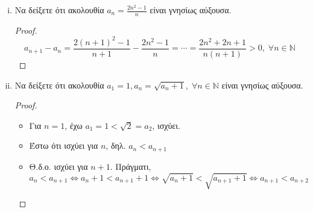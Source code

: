 \begin{enumerate}
\begin{enumerate}[i)]
            \item Να δείξετε ότι ακολουθία $ a_{n} = \frac{2n^{2}-1}{n} $ είναι γνησίως 
                αύξουσα.

                \begin{proof}
                    \[
                        a_{n+1}- a_{n} = \frac{2(n+1)^{2}-1}{n+1} - \frac{2n^{2}-1}{n} = \cdots = 
                        \frac{2n^{2}+2n+1}{n(n+1)} >0, \; \forall n \in \mathbb{N}
                    \] 
                \end{proof}

            \item Να δείξετε ότι ακολουθία $ a_{1}=1, a_{n} = \sqrt{a_{n}+1}, \; 
                \forall n \in \mathbb{N}$ είναι γνησίως αύξουσα.

                \begin{proof}
                    \begin{itemize}
                        \item Για $ n=1 $, έχω $ a_{1}=1 < \sqrt{2} = a_{2} $, ισχύει.
                        \item Έστω ότι ισχύει για $n$, δηλ. $ a_{n}< a_{n+1} $
                        \item Θ.δ.ο. ισχύει για $ n+1 $. Πράγματι,
                            \[
                                a_{n} < a_{n+1} \Leftrightarrow a_{n}+1 < a_{n+1}+1 
                                \Leftrightarrow \sqrt{a_{n}+1} < \sqrt{a_{n+1}+1} 
                                \Leftrightarrow a_{n+1}< a_{n+2}
                            \] 
                    \end{itemize}
                \end{proof}

        \end{enumerate}
\end{enumerate}






